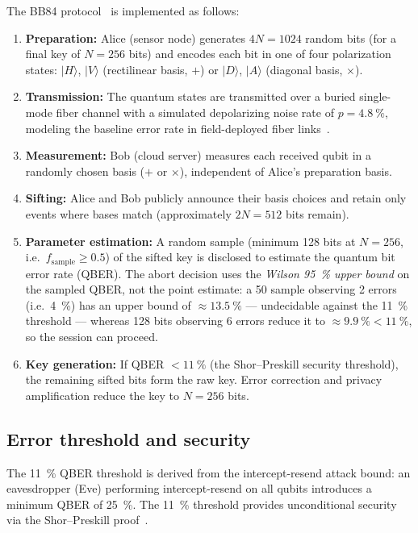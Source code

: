 \documentclass[11pt,a4paper]{article}
\begin{document}
The BB84 protocol~\cite{Bennett1984} is implemented as follows:
\begin{enumerate}
\item \textbf{Preparation:} Alice (sensor node) generates $4N = 1024$ random bits (for a final key of $N = 256$ bits) and encodes each bit in one of four polarization states: $|H\rangle$, $|V\rangle$ (rectilinear basis, $+$) or $|D\rangle$, $|A\rangle$ (diagonal basis, $\times$).
\item \textbf{Transmission:} The quantum states are transmitted over a buried single-mode fiber channel with a simulated depolarizing noise rate of $p = \qty{4.8}{\percent}$, modeling the baseline error rate in field-deployed fiber links~\cite{Zahidy2024}.
\item \textbf{Measurement:} Bob (cloud server) measures each received qubit in a randomly chosen basis ($+$ or $\times$), independent of Alice's preparation basis.
\item \textbf{Sifting:} Alice and Bob publicly announce their basis choices and retain only events where bases match (approximately $2N = 512$ bits remain).
\item \textbf{Parameter estimation:} A random sample (minimum 128 bits at $N=256$, i.e.\ $f_{\mathrm{sample}} \ge 0.5$) of the sifted key is disclosed to estimate the quantum bit error rate (QBER). The abort decision uses the \textit{Wilson \qty{95}{\percent} upper bound} on the sampled QBER, not the point estimate: a \qty{50}{\bit} sample observing 2 errors (i.e.\ \qty{4}{\percent}) has an upper bound of $\approx\qty{13.5}{\percent}$ --- undecidable against the \qty{11}{\percent} threshold --- whereas 128 bits observing 6 errors reduce it to $\approx\qty{9.9}{\percent} < \qty{11}{\percent}$, so the session can proceed.
\item \textbf{Key generation:} If QBER $< \qty{11}{\percent}$ (the Shor--Preskill security threshold), the remaining sifted bits form the raw key. Error correction and privacy amplification reduce the key to $N = 256$ bits.
\end{enumerate}

\subsection{Error threshold and security}

The \qty{11}{\percent} QBER threshold is derived from the intercept-resend attack bound: an eavesdropper (Eve) performing intercept-resend on all qubits introduces a minimum QBER of \qty{25}{\percent}. The \qty{11}{\percent} threshold provides unconditional security via the Shor--Preskill proof~\cite{Shor2000}.
\end{document}
